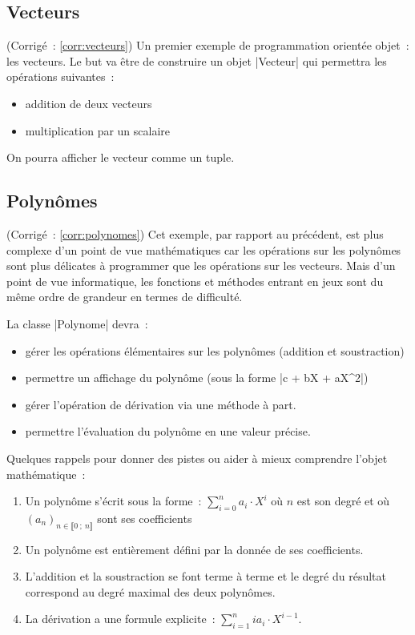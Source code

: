 	\subsection{Vecteurs} \label{appl:vecteurs} (Corrigé~: \ref{corr:vecteurs})
		Un premier exemple de programmation orientée objet~: les vecteurs. Le but va être de construire un objet \python|Vecteur| qui permettra les opérations suivantes~:
		\begin{itemize}
			\item addition de deux vecteurs
			\item multiplication par un scalaire
		\end{itemize}
		On pourra afficher le vecteur comme un tuple.
	
	\subsection{Polynômes} \label{appl:polynomes} (Corrigé~: \ref{corr:polynomes})		
		Cet exemple, par rapport au précédent, est plus complexe d'un point de vue mathématiques car les opérations sur les polynômes sont plus délicates à programmer que les opérations sur les vecteurs. Mais d'un point de vue informatique, les fonctions et méthodes entrant en jeux sont du même ordre de grandeur en termes de difficulté.
		
		La classe \python|Polynome| devra~:
		\begin{itemize}
			\item gérer les opérations élémentaires sur les polynômes (addition et soustraction)
			\item permettre un affichage du polynôme (sous la forme \python|c + bX + aX^2|)
			\item gérer l'opération de dérivation via une méthode à part.
			\item permettre l'évaluation du polynôme en une valeur précise.
		\end{itemize}
		
		Quelques rappels pour donner des pistes ou aider à mieux comprendre l'objet mathématique~:
		\begin{enumerate}
			\item Un polynôme s'écrit sous la forme~: $\sum_{i = 0}^n a_i \cdot X^i$ où $n$ est son degré et où $(a_n)_{n \in \llbracket 0~;\ n \rrbracket}$ sont ses coefficients
			\item Un polynôme est entièrement défini par la donnée de ses coefficients.
			\item L'addition et la soustraction se font terme à terme et le degré du résultat correspond au degré maximal des deux polynômes.
			\item La dérivation a une formule explicite~: $\sum_{i = 1}^n ia_i \cdot X^{i - 1}$.
		\end{enumerate} 
	
	
	

